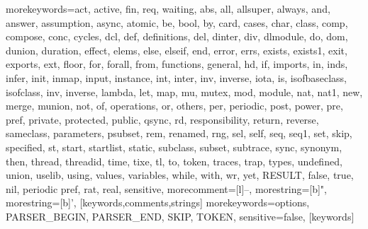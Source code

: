   {morekeywords={act, active, fin, req, waiting, abs, all, allsuper, always, and, answer, 
     assumption, async, atomic, be, bool, by, card, cases, char, class, comp, compose, conc, cycles,
     dcl, def, definitions, del, dinter, div, dlmodule, do, dom, dunion, duration, effect, elems, else, elseif, end,
     error, errs, exists, exists1, exit, exports, ext, floor, for, forall, from, functions, 
     general, hd, if, imports, in, inds, infer, init, inmap, input, instance, int, inter, inv, inverse, iota, is, 
     isofbaseclass, isofclass, inv, inverse, lambda, let, map, mu,
     mutex, mod, module, nat, nat1, new, merge, 
     munion, not, of, operations, or, others, per, periodic, post, power, pre, pref, 
     private, protected, public, qsync, rd, responsibility, return, reverse,  
     sameclass, parameters, psubset, rem, renamed, rng, sel, self, seq, seq1, set, skip, specified, st, 
     start, startlist, static, subclass, subset, subtrace, sync, synonym, then, thread, 
     threadid, time, tixe, tl, to, token, traces, trap, types, undefined,
     union, uselib, using, values, 
     variables, while, with, wr, yet, RESULT, false, true, nil, periodic pref, rat, real},
   sensitive,
   morecomment=[l]--,
   morestring=[b]",
   morestring=[b]',
  }[keywords,comments,strings]
  {morekeywords={options, PARSER\_BEGIN, PARSER\_END, SKIP, TOKEN},
   sensitive=false,
  }[keywords]
